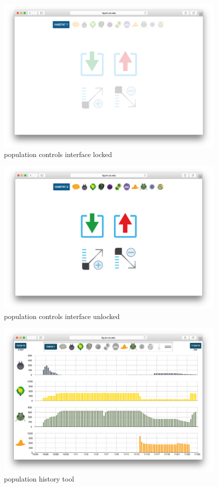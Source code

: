 \begin{figure}
\centering
\includegraphics[width=4.5in]{images/population-controls-locked.png}
\caption{population controls interface locked}
\label{fig:population_controls_locked}
\end{figure}

\begin{figure}
\centering
\includegraphics[width=4.5in]{images/population-controls-unlocked.png}
\caption{population controls interface unlocked}
\label{fig:population_controls_unlocked}
\end{figure}

\begin{figure}
\centering
\includegraphics[width=4.5in]{images/population-history.png}
\caption{population history tool}
\label{fig:population_history}
\end{figure}

